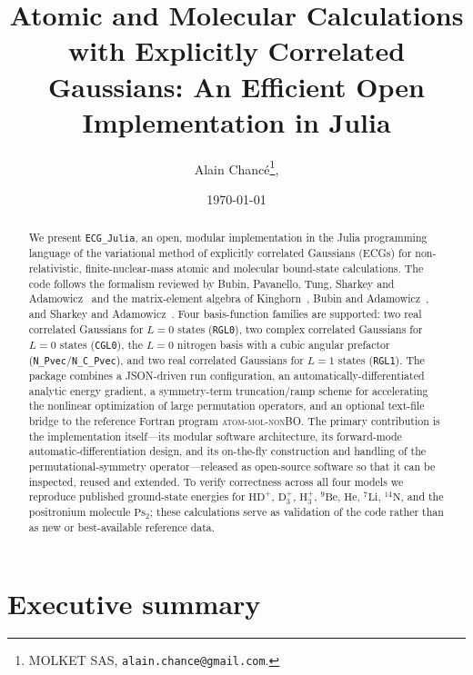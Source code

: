 \documentclass[11pt]{article}
\title{Atomic and Molecular Calculations with Explicitly Correlated
Gaussians: An Efficient Open Implementation in Julia}
\author{Alain Chanc\'e\thanks{MOLKET SAS, \texttt{alain.chance@gmail.com}.},
\orcidlink{0009-0004-3619-2267}}
\date{\today}
\begin{document}
\maketitle

\begin{abstract}
We present \texttt{ECG\_Julia}, an open, modular implementation in the Julia
programming language of the variational method of explicitly correlated
Gaussians (ECGs) for non-relativistic, finite-nuclear-mass atomic and
molecular bound-state calculations. The code follows the formalism reviewed
by Bubin, Pavanello, Tung, Sharkey and Adamowicz~\cite{Bubin2013} and the
matrix-element algebra of Kinghorn~\cite{Kinghorn1996}, Bubin and
Adamowicz~\cite{Bubin2008}, and Sharkey and Adamowicz~\cite{Sharkey2014}.
Four basis-function families are supported: two real correlated Gaussians for
$L=0$ states (\texttt{RGL0}), two complex correlated Gaussians for $L=0$
states (\texttt{CGL0}), the $L=0$ nitrogen basis with a cubic angular
prefactor (\texttt{N\_Pvec}/\texttt{N\_C\_Pvec}), and two real correlated
Gaussians for $L=1$ states (\texttt{RGL1}). The package combines a
JSON-driven run configuration, an automatically-differentiated analytic
energy gradient, a symmetry-term truncation/ramp scheme for accelerating
the nonlinear optimization of large permutation operators, and an optional
text-file bridge to the reference Fortran program \textsc{atom-mol-nonBO}.
The primary contribution is the implementation itself---its modular software
architecture, its forward-mode automatic-differentiation design, and its
on-the-fly construction and handling of the permutational-symmetry
operator---released as open-source software so that it can be inspected,
reused and extended. To verify correctness across all four models we
reproduce published ground-state energies for $\mathrm{HD^+}$,
$\mathrm{D_3^+}$, $\mathrm{H_3^+}$, $^9\mathrm{Be}$, $\mathrm{He}$, $^7\mathrm{Li}$,
$^{14}\mathrm{N}$, and the positronium molecule $\mathrm{Ps_2}$; these
calculations serve as validation of the code rather than as new or
best-available reference data.
\end{abstract}

\tableofcontents

\section*{Executive summary}
\end{document}
